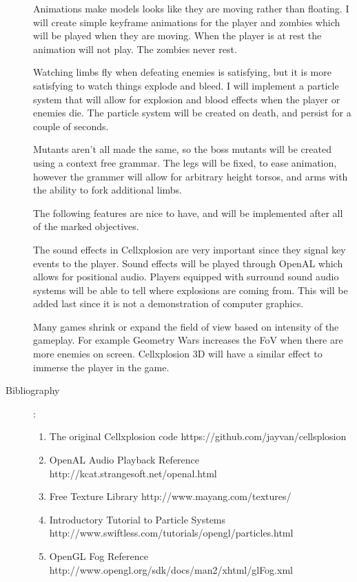 \documentclass {article}
\begin{document}
\begin{description}
Animations make models looks like they are moving rather than floating. I will create simple keyframe animations for the player and zombies which will be played when they are moving. When the player is at rest the animation will not play. The zombies never rest.

Watching limbs fly when defeating enemies is satisfying, but it is more satisfying to watch things explode and bleed. I will implement a particle system that will allow for explosion and blood effects when the player or enemies die. The particle system will be created on death, and persist for a couple of seconds.

Mutants aren't all made the same, so the boss mutants will be created using a context free grammar. The legs will be fixed, to ease animation, however the grammer will allow for arbitrary height torsos, and arms with the ability to fork additional limbs.

The following features are nice to have, and will be implemented after all of the marked objectives.

The sound effects in Cellxplosion are very important since they signal key events to the player.
Sound effects will be played through OpenAL which allows for positional audio.
Players equipped with surround sound audio systems will be able to tell where explosions are coming from. This will be added last since it is not a demonstration of computer graphics.

Many games shrink or expand the field of view based on intensity of the gameplay.
For example Geometry Wars increases the FoV when there are more enemies on screen.
Cellxplosion 3D will have a similar effect to immerse the player in the game.

\item[Bibliography]:\\
\begin{enumerate}
\item The original Cellxplosion code https://github.com/jayvan/cellsplosion

\item OpenAL Audio Playback Reference http://kcat.strangesoft.net/openal.html

\item Free Texture Library http://www.mayang.com/textures/

\item Introductory Tutorial to Particle Systems http://www.swiftless.com/tutorials/opengl/particles.html

\item OpenGL Fog Reference http://www.opengl.org/sdk/docs/man2/xhtml/glFog.xml


\end{enumerate}
\end{description}
\end{document}
